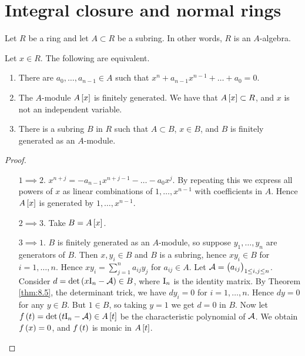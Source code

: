 \pagebreak

\section{Integral closure and normal rings}

Let $ R $ be a ring and let $ A \subset R $ be a subring. In other words, $ R $ is an $ A $-algebra.

\begin{theorem}
\label{thm:14.1}
Let $ x \in R $. The following are equivalent.
\begin{enumerate}
\item There are $ a_0, \dots, a_{n - 1} \in A $ such that $ x^n + a_{n - 1}x^{n - 1} + \dots + a_0 = 0 $.
\item The $ A $-module $ A\sbr{x} $ is finitely generated. We have that $ A\sbr{x} \subset R $, and $ x $ is not an independent variable.
\item There is a subring $ B $ in $ R $ such that $ A \subset B $, $ x \in B $, and $ B $ is finitely generated as an $ A $-module.
\end{enumerate}
\end{theorem}

\begin{proof}
\hfill
\begin{itemize}[leftmargin=0.5in]
\item[$ 1 \implies 2 $.] $ x^{n + j} = -a_{n - 1}x^{n + j - 1} - \dots - a_0x^j $. By repeating this we express all powers of $ x $ as linear combinations of $ 1, \dots, x^{n - 1} $ with coefficients in $ A $. Hence $ A\sbr{x} $ is generated by $ 1, \dots, x^{n - 1} $.
\item[$ 2 \implies 3 $.] Take $ B = A\sbr{x} $.
\item[$ 3 \implies 1 $.] $ B $ is finitely generated as an $ A $-module, so suppose $ y_1, \dots, y_n $ are generators of $ B $. Then $ x, y_i \in B $ and $ B $ is a subring, hence $ xy_i \in B $ for $ i = 1, \dots, n $. Hence $ xy_i = \sum_{j = 1}^n a_{ij}y_j $ for $ a_{ij} \in A $. Let $ \AAA = \br{a_{ij}}_{1 \le i, j \le n} $. Consider $ d = \det \br{x\I_n - \AAA} \in B $, where $ \mathrm{I}_n $ is the identity matrix. By Theorem \ref{thm:8.5}, the determinant trick, we have $ dy_i = 0 $ for $ i = 1, \dots, n $. Hence $ dy = 0 $ for any $ y \in B $. But $ 1 \in B $, so taking $ y = 1 $ we get $ d = 0 $ in $ B $. Now let $ f\br{t} = \det \br{t\I_n - \AAA} \in A\sbr{t} $ be the characteristic polynomial of $ \mathcal{A} $. We obtain $ f\br{x} = 0 $, and $ f\br{t} $ is monic in $ A\sbr{t} $.
\end{itemize}
\end{proof}

